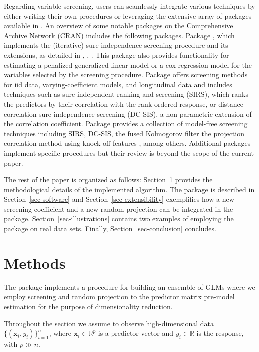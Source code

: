 \documentclass[
  article]{jss}
\begin{document}
Regarding variable screening, users can seamlessly integrate various
techniques by either writing their own procedures or leveraging the
extensive array of packages available in . An overview of
some notable packages on the Comprehensive  Archive Network
(CRAN) includes the following packages. Package  \citep{SISR},
which implements the (iterative) sure independence screening procedure
and its extensions, as detailed in \citet{Fan2007SISforUHD},
\citet{Fan2010sisglms}, \citet{fan2010high}. This package also provides
functionality for estimating a penalized generalized linear model or a
cox regression model for the variables selected by the screening
procedure. Package  \citep{pkg:VariableScreening}
offers screening methods for iid data, varying-coefficient models, and
longitudinal data and includes techniques such as sure independent
ranking and screening (SIRS), which ranks the predictors by their
correlation with the rank-ordered response, or distance correlation sure
independence screening (DC-SIS), a non-parametric extension of the
correlation coefficient. Package  \citep{pkg:MFSIS} provides
a collection of model-free screening techniques including SIRS, DC-SIS,
the fused Kolmogorov filter \citep{mai2015fusedkolmogorov} the
projection correlation method using knock-off features
\citep{liu2020knockoff}, among others. Additional packages implement
specific procedures but their review is beyond the scope of the current
paper.

The rest of the paper is organized as follows: Section~\ref{sec-models}
provides the methodological details of the implemented algorithm. The
package is described in Section~\ref{sec-software} and
Section~\ref{sec-extensibility} exemplifies how a new screening
coefficient and a new random projection can be integrated in the
package. Section~\ref{sec-illustrations} contains two examples of
employing the package on real data sets. Finally,
Section~\ref{sec-conclusion} concludes.

\section{Methods}\label{sec-models}

The package implements a procedure for building an ensemble of GLMs
where we employ screening and random projection to the predictor matrix
pre-model estimation for the purpose of dimensionality reduction.

Throughout the section we assume to observe high-dimensional data
\(\{(\boldsymbol{x}_i,y_i)\}_{i=1}^n\), where
\(\boldsymbol{x}_i\in\mathbb{R}^p\) is a predictor vector and
\(y_i\in\mathbb{R}\) is the response, with \(p\gg n\).
\end{document}
